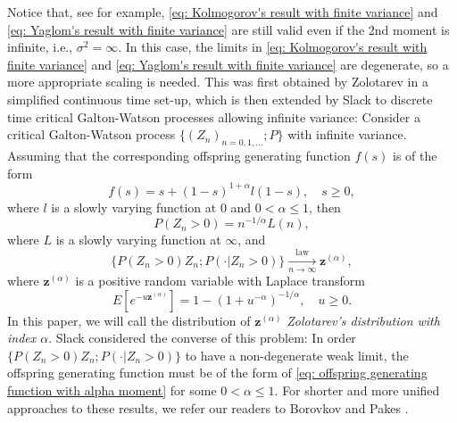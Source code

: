 \documentclass[12pt, a4paper]{amsart}
\theoremstyle{definition}
\numberwithin{equation}{section}
\begin{document}
    Notice that, see \cite{KestenNeySpitzer1966The-Galton-Watson} for example,
    \eqref{eq: Kolmogorov's result with finite variance} and \eqref{eq: Yaglom's result with finite variance} are still valid even if the 2nd moment is infinite, i.e., $\sigma^2 = \infty$.
    In this case, the limits in \eqref{eq: Kolmogorov's result with finite variance} and \eqref{eq: Yaglom's result with finite variance} are degenerate, so a more appropriate scaling is needed.
	This was first obtained by Zolotarev \cite{Zolotarev1957More} in a simplified continuous time set-up,
	which is then extended by Slack \cite{Slack1968A-branching} to discrete time critical Galton-Watson processes allowing infinite variance:  Consider a critical Galton-Watson 
	process $\{(Z_n)_{n = 0,1,\dots}; P\}$
	with infinite variance.
	Assuming that 
	the corresponding offspring generating function $f(s)$
	is of the form
\[\label{eq: offspring generating function with alpha moment}
	f(s)
	= s + (1-s)^{1+ \alpha} l(1-s),
	\quad s\geq 0,
\]
	where $l$ is a slowly varying function at $0$ and $0 < \alpha \leq 1$, then
\[ \label{eq: extinction probability of critical GW process without 2rd moment}
	P(Z_n > 0) = n^{-1/\alpha} L(n),
\]
	where $L$ is a slowly varying function at $\infty$, and
\[\label{eq: conditional distribution of critical GW process without 2rd moment}
	\big\{ P(Z_n > 0) Z_n; P(\cdot | Z_n > 0)\big\}
	\xrightarrow[n\to \infty]{\operatorname{law}} \mathbf z^{(\alpha)},
\]
	where $\mathbf z^{(\alpha)}$ is a positive random variable with Laplace transform
\[
	E[e^{- u \mathbf z^{(\alpha)}}]
	= 1 - (1+ u^{-\alpha})^{-1/\alpha},
	\quad u \geq 0.
\]
	In this paper, we will call the distribution of $\mathbf z^{(\alpha)}$ \emph{Zolotarev's distribution with index $\alpha$}.
	Slack \cite{Slack1972Further} considered the converse of this problem:
	In order $\big\{ P(Z_n > 0) Z_n; P(\cdot | Z_n > 0)\big\}$ to have a non-degenerate weak limit, the offspring generating function must be of  the form of \eqref{eq: offspring generating function with alpha moment} for some $0 < \alpha \leq 1$.
	For shorter and more unified approaches to these results, we refer our readers to Borovkov \cite{Borovkov1989Method} and Pakes \cite{Pakes2010Critical}.
\end{document}
